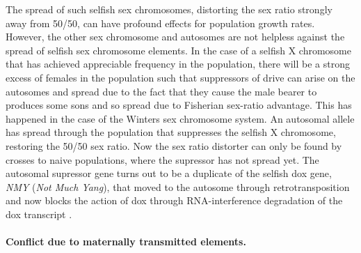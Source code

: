 {The spread of such selfish sex chromosomes, distorting the sex ratio
strongly away from 50/50, can have profound effects for population
growth rates. However, the other sex chromosome and autosomes are not helpless
against the spread of selfish sex chromosome elements. In the case of
a selfish X chromosome that has achieved appreciable frequency in the population, there will be a strong excess of females
in the population such that suppressors of drive can arise on the autosomes
and spread due to the fact that they  cause the male bearer to
produces some sons and so spread due to Fisherian sex-ratio advantage.
This has happened in the case of the Winters sex chromosome system. An
autosomal allele has spread through the population that suppresses the
selfish X chromosome, restoring the 50/50 sex ratio. Now the sex ratio
distorter can only be found by crosses to naive populations, where the
supressor has not spread yet. The autosomal supressor gene turns out to be
a duplicate of the selfish dox gene, {\it NMY} ({\it Not Much Yang}), that moved to the
autosome through retrotransposition and now blocks the action of dox
through RNA-interference degradation of the dox transcript \citep[][ see Figure \ref{fig:dox_cartoon}]{tao2007sex}.


\paragraph{Conflict due to maternally transmitted elements.}






}
